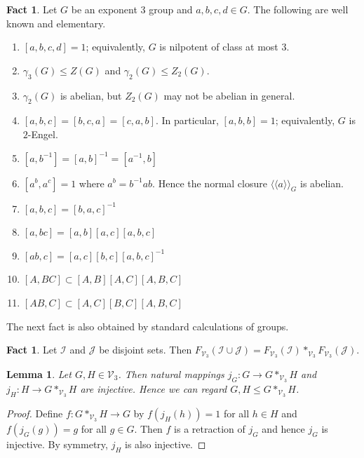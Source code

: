 \documentclass[11pt,reqno]{article}
\newtheorem{lemma}[theorem]{Lemma}
\theoremstyle{definition}
\newtheorem{fact}[theorem]{Fact}
\theoremstyle{remark}
\newcommand{\llangle}{\langle\!\langle}
\newcommand{\rrangle}{\rangle\!\rangle}
\begin{document}
\begin{fact}\label{fact:elementary equations}
Let $G$ be an exponent $3$ group and $a,b,c,d\in G$.
The following are well known and elementary.
\begin{enumerate}
    \item $[a,b,c,d]=1$; equivalently, $G$ is nilpotent of class at most $3$.
    \item $\gamma_3(G)\leq Z(G)$ and $\gamma_2(G)\leq Z_2(G)$.
    \item $\gamma_2(G)$ is abelian, but $Z_2(G)$ may not be abelian in general. 
    \item $[a,b,c]=[b,c,a]=[c,a,b]$. In particular, $[a,b,b]=1$; equivalently, $G$ is $2$-Engel.
    \item $[a,b^{-1}]=[a,b]^{-1}=[a^{-1},b]$
    \item $[a^b,a^c]=1$ where $a^b=b^{-1}ab$. Hence the normal closure $\llangle a\rrangle_G$ is abelian.
    \item $[a,b,c]=[b,a,c]^{-1}$
    \item $[a,bc]=[a,b][a,c][a,b,c]$
    \item $[ab,c]=[a,c][b,c][a,b,c]^{-1}$
    \item $[A,BC]\subset [A,B][A,C][A,B,C]$
    \item $[AB,C] \subset [A,C][B,C][A,B,C]$
\end{enumerate}
\end{fact}

The next fact is also obtained by standard calculations of groups.
\begin{fact}
Let $\mathcal I$ and $\mathcal J$ be disjoint sets. Then $F_{\mathcal V_3}(\mathcal I\cup \mathcal J)=F_{\mathcal V_3}(\mathcal I)*_{\mathcal V_3}F_{\mathcal V_3}(\mathcal J)$.
\end{fact}

\begin{lemma}
    Let $G,H\in\mathcal V_3$.
    Then natural mappings $j_G:G\to G*_{\mathcal V_3}H$ and $j_H:H\to G*_{\mathcal V_3}H$ are injective.
    Hence we can regard $G,H\leq G*_{\mathcal V_3}H$.
\end{lemma}
\begin{proof}
    Define $f:G*_{\mathcal V_3} H\to G$ by $f(j_H(h))=1$ for all $h\in H$ and $f(j_G(g))=g$ for all $g\in G$. 
    Then $f$ is a retraction of $j_G$ and hence $j_G$ is injective.
    By symmetry, $j_H$ is also injective.
\end{proof}
\end{document}
